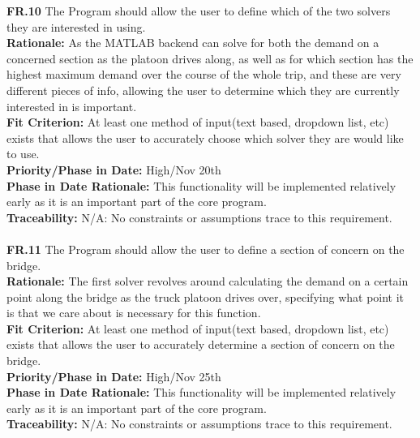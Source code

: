 \documentclass[12pt]{article}
\begin{document}
  \noindent\textbf{FR.10} The Program should allow the user to define which of the two solvers they are interested in using.\\
  \textbf{Rationale:} As the MATLAB backend can solve for both the demand on a concerned section as the platoon drives along, as well as for which section has the 
  highest maximum demand over the course of the whole trip, and these are very different pieces of info, allowing the user to determine which they are currently interested in 
  is important.\\
  \textbf{Fit Criterion:} At least one method of input(text based, dropdown list, etc) exists that allows the user to accurately choose which solver they are would like to use.\\
  \textbf{Priority/Phase in Date:} High/Nov 20th\\
  \textbf{Phase in Date Rationale:} This functionality will be implemented relatively early as it is an important part of the core program.\\
  \textbf{Traceability:} N/A: No constraints or assumptions trace to this requirement.\\\\

  \noindent\textbf{FR.11} The Program should allow the user to define a section of concern on the bridge.\\
  \textbf{Rationale:} The first solver revolves around calculating the demand on a certain point along the bridge as the truck platoon drives over, specifying what point it is
  that we care about is necessary for this function.\\
  \textbf{Fit Criterion:} At least one method of input(text based, dropdown list, etc) exists that allows the user to accurately determine a section of concern on the bridge.\\
  \textbf{Priority/Phase in Date:} High/Nov 25th\\
  \textbf{Phase in Date Rationale:} This functionality will be implemented relatively early as it is an important part of the core program.\\
  \textbf{Traceability:} N/A: No constraints or assumptions trace to this requirement.\\\\
\end{document}
